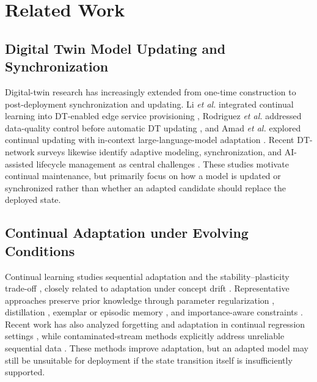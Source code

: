 \section{Related Work}
\label{sec:related}

\subsection{Digital Twin Model Updating and Synchronization}
Digital-twin research has increasingly extended from one-time construction to post-deployment synchronization and updating. Li \emph{et al.} integrated continual learning into DT-enabled edge service provisioning \cite{li2024dtcl}, Rodriguez \emph{et al.} addressed data-quality control before automatic DT updating \cite{rodriguez2023updating}, and Amad \emph{et al.} explored continual updating with in-context large-language-model adaptation \cite{amad2025calmdt}. Recent DT-network surveys likewise identify adaptive modeling, synchronization, and AI-assisted lifecycle management as central challenges \cite{qin2024dtnn,hakiri2024dtsurvey}. These studies motivate continual maintenance, but primarily focus on how a model is updated or synchronized rather than whether an adapted candidate should replace the deployed state.

\subsection{Continual Adaptation under Evolving Conditions}
Continual learning studies sequential adaptation and the stability--plasticity trade-off \cite{parisi2019review,delange2022survey,wang2024clsurvey,son2025survey}, closely related to adaptation under concept drift \cite{gama2014drift}. Representative approaches preserve prior knowledge through parameter regularization \cite{kirkpatrick2017ewc}, distillation \cite{li2016lwf}, exemplar or episodic memory \cite{rebuffi2017icarl,lopezpaz2017gem,rolnick2019replay}, and importance-aware constraints \cite{aljundi2018mas}. Recent work has also analyzed forgetting and adaptation in continual regression settings \cite{ding2024forgetting}, while contaminated-stream methods explicitly address unreliable sequential data \cite{bang2022contaminated}. These methods improve adaptation, but an adapted model may still be unsuitable for deployment if the state transition itself is insufficiently supported.

